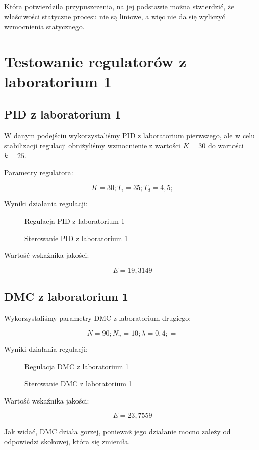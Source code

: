 Która potwierdziła przypuszczenia, na jej podstawie można stwierdzić, że właściwości statyczne procesu nie są liniowe, a więc nie da się wyliczyć wzmocnienia statycznego.

\section{Testowanie regulatorów z laboratorium 1}

\subsection{PID z laboratorium 1}

W danym podejściu wykorzystaliśmy PID z laboratorium pierwszego, ale w celu stabilizacji regulacji obniżyliśmy wzmocnienie z wartości $K = 30$ do wartości $k = 25$.

Parametry regulatora:

\begin{equation}
K = 30; 
T_i = 35; 
T_d = 4,5; 
\end{equation}

Wyniki działania regulacji:

\begin{figure}[H]
\centering

\caption{Regulacja PID z laboratorium 1}
\end{figure}

\begin{figure}[H]
\centering

\caption{Sterowanie PID z laboratorium 1}
\end{figure}

Wartość wskaźnika jakości:

\begin{equation}
E = 19,3149
\end{equation}

\subsection{DMC z laboratorium 1}

Wykorzystaliśmy parametry DMC z laboratorium drugiego:

\begin{equation}
N = 90; 
N_u = 10; 
\lambda = 0,4; 
 = \end{equation}
 
Wyniki działania regulacji:

\begin{figure}[H]
\centering

\caption{Regulacja DMC z laboratorium 1}
\end{figure}

\begin{figure}[H]
\centering

\caption{Sterowanie DMC z laboratorium 1}
\end{figure}

Wartość wskaźnika jakości:

\begin{equation}
E = 23,7559
\end{equation}

Jak widać, DMC działa gorzej, ponieważ jego działanie mocno zależy od odpowiedzi skokowej, która się zmieniła.